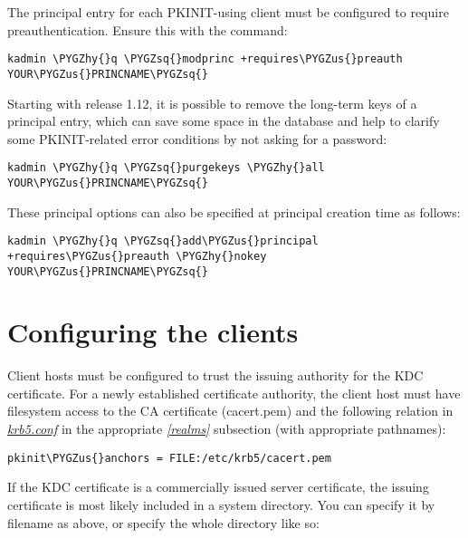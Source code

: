 \documentclass[letterpaper,10pt,english]{sphinxmanual}
\def\PYGZus{\char`\_}
\def\PYGZhy{\char`\-}
\def\PYGZsq{\char`\'}
\begin{document}
The principal entry for each PKINIT-using client must be configured to
require preauthentication.  Ensure this with the command:

\begin{Verbatim}[commandchars=\\\{\}]
kadmin \PYGZhy{}q \PYGZsq{}modprinc +requires\PYGZus{}preauth YOUR\PYGZus{}PRINCNAME\PYGZsq{}
\end{Verbatim}

Starting with release 1.12, it is possible to remove the long-term
keys of a principal entry, which can save some space in the database
and help to clarify some PKINIT-related error conditions by not asking
for a password:

\begin{Verbatim}[commandchars=\\\{\}]
kadmin \PYGZhy{}q \PYGZsq{}purgekeys \PYGZhy{}all YOUR\PYGZus{}PRINCNAME\PYGZsq{}
\end{Verbatim}

These principal options can also be specified at principal creation
time as follows:

\begin{Verbatim}[commandchars=\\\{\}]
kadmin \PYGZhy{}q \PYGZsq{}add\PYGZus{}principal +requires\PYGZus{}preauth \PYGZhy{}nokey YOUR\PYGZus{}PRINCNAME\PYGZsq{}
\end{Verbatim}


\section{Configuring the clients}
\label{admin/pkinit:configuring-the-clients}
Client hosts must be configured to trust the issuing authority for the
KDC certificate.  For a newly established certificate authority, the
client host must have filesystem access to the CA certificate
(cacert.pem) and the following relation in {\hyperref[admin/conf_files/krb5_conf:krb5-conf-5]{\emph{krb5.conf}}} in the
appropriate {\hyperref[admin/conf_files/krb5_conf:realms]{\emph{{[}realms{]}}}} subsection (with appropriate pathnames):

\begin{Verbatim}[commandchars=\\\{\}]
pkinit\PYGZus{}anchors = FILE:/etc/krb5/cacert.pem
\end{Verbatim}

If the KDC certificate is a commercially issued server certificate,
the issuing certificate is most likely included in a system directory.
You can specify it by filename as above, or specify the whole
directory like so:
\end{document}
